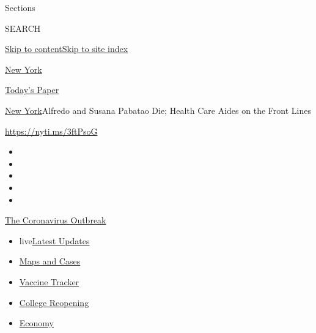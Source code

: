 Sections

SEARCH

\protect\hyperlink{site-content}{Skip to
content}\protect\hyperlink{site-index}{Skip to site index}

\href{https://www.nytimes3xbfgragh.onion/section/nyregion}{New York}

\href{https://myaccount.nytimes3xbfgragh.onion/auth/login?response_type=cookie\&client_id=vi}{}

\href{https://www.nytimes3xbfgragh.onion/section/todayspaper}{Today's
Paper}

\href{/section/nyregion}{New York}\textbar{}Alfredo and Susana Pabatao
Die; Health Care Aides on the Front Lines

\url{https://nyti.ms/3ftPsoG}

\begin{itemize}
\item
\item
\item
\item
\item
\end{itemize}

\href{https://www.nytimes3xbfgragh.onion/news-event/coronavirus?action=click\&pgtype=Article\&state=default\&region=TOP_BANNER\&context=storylines_menu}{The
Coronavirus Outbreak}

\begin{itemize}
\tightlist
\item
  live\href{https://www.nytimes3xbfgragh.onion/2020/08/04/world/coronavirus-covid-19.html?action=click\&pgtype=Article\&state=default\&region=TOP_BANNER\&context=storylines_menu}{Latest
  Updates}
\item
  \href{https://www.nytimes3xbfgragh.onion/interactive/2020/us/coronavirus-us-cases.html?action=click\&pgtype=Article\&state=default\&region=TOP_BANNER\&context=storylines_menu}{Maps
  and Cases}
\item
  \href{https://www.nytimes3xbfgragh.onion/interactive/2020/science/coronavirus-vaccine-tracker.html?action=click\&pgtype=Article\&state=default\&region=TOP_BANNER\&context=storylines_menu}{Vaccine
  Tracker}
\item
  \href{https://www.nytimes3xbfgragh.onion/2020/08/02/us/covid-college-reopening.html?action=click\&pgtype=Article\&state=default\&region=TOP_BANNER\&context=storylines_menu}{College
  Reopening}
\item
  \href{https://www.nytimes3xbfgragh.onion/live/2020/08/03/business/stock-market-today-coronavirus?action=click\&pgtype=Article\&state=default\&region=TOP_BANNER\&context=storylines_menu}{Economy}
\end{itemize}

